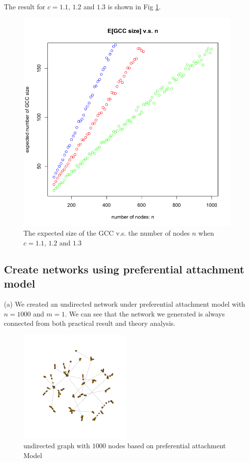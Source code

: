 \documentclass[draftcls,12pt,onecolumn]{IEEEtran}
\begin{document}
The result for $c=1.1$, $1.2$ and $1.3$ is shown in Fig \ref{fig14}.
\begin{figure}[H]
\centering
\includegraphics[scale=0.3]{figures_part1_1/output_24_0.png}
\caption{The expected size of the GCC v.s. the number of nodes $n$ when $c=1.1$, $1.2$ and $1.3$}
\label{fig14}
\end{figure}







\subsection{Create networks using preferential attachment model}
(a) We created an undirected network under preferential attachment model with $n = 1000$ and $m = 1$. We can see that the network we generated is always connected from both practical result and theory analysis.
\begin{figure}[H]
\centering
\includegraphics[width=0.5\textwidth]{1_2_a_network.png}
\caption{undirected graph with $1000$ nodes based on preferential attachment Model}
\end{figure}
\end{document}
